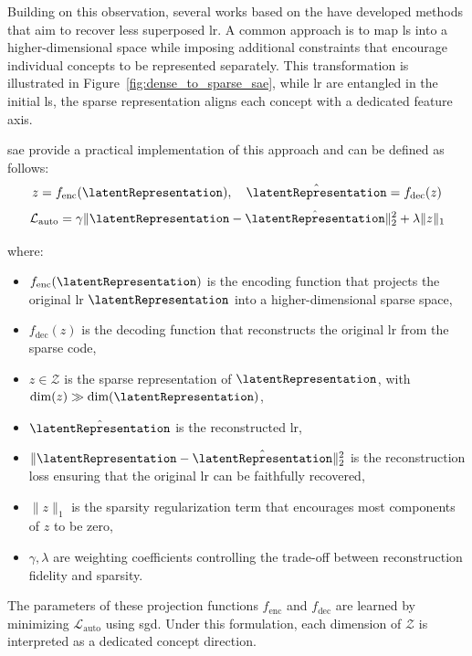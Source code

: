 Building on this observation, several works based on the \SuperpositionHypothesisName have developed methods that aim to recover less superposed \gls{lr}.
A common approach is to map \gls{ls} into a higher-dimensional space while imposing additional constraints that encourage individual concepts to be represented separately.
This transformation is illustrated in Figure~\ref{fig:dense_to_sparse_sae}, while \gls{lr} are entangled in the initial \gls{ls}, the sparse representation aligns each concept with a dedicated feature axis.



\gls{sae} provide a practical implementation of this approach and can be defined as follows:
\[
z = f_{\text{enc}}(\latentRepresentation), \quad \hat{\latentRepresentation} = f_{\text{dec}}(z)
\]
\[
\mathcal{L}_{\text{auto}} = \gamma \|\latentRepresentation - \hat{\latentRepresentation}\|_2^2 + \lambda \|z\|_1
\]

where:
\begin{itemize}
    \item $f_{\text{enc}}(\latentRepresentation)$ is the encoding function that projects the original \gls{lr} $\latentRepresentation$ into a higher-dimensional sparse space,
    \item $f_{\text{dec}}(z)$ is the decoding function that reconstructs the original \gls{lr} from the sparse code,
    \item $z \in \mathcal{Z}$ is the sparse representation of $\latentRepresentation$, with $\dim(z) \gg \dim(\latentRepresentation)$,
    \item $\hat{\latentRepresentation}$ is the reconstructed \gls{lr},
    \item $\|\latentRepresentation - \hat{\latentRepresentation}\|_2^2$ is the reconstruction loss ensuring that the original \gls{lr} can be faithfully recovered,
    \item $\|z\|_1$ is the sparsity regularization term that encourages most components of $z$ to be zero,
    \item $\gamma, \lambda$ are weighting coefficients controlling the trade-off between reconstruction fidelity and sparsity.
\end{itemize}

The parameters of these projection functions $f_{\text{enc}}$ and $f_{\text{dec}}$ are learned by minimizing $\mathcal{L}_{\text{auto}}$ using \gls{sgd}.
Under this formulation, each dimension of $\mathcal{Z}$ is interpreted as a dedicated concept direction.

